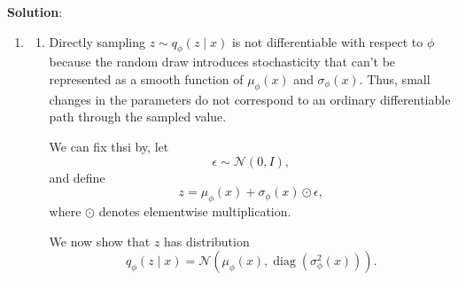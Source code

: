 \documentclass[submit]{harvardml}
\newenvironment{solution}{
    \vspace{2mm}
    \color{blue}\noindent\textbf{Solution}:
}{}
\begin{document}
\begin{solution}
\begin{enumerate}
\begin{enumerate}
\begin{enumerate}
Hence, \[
\boxed{
\mathrm{ELBO}
=
\mathbb{E}_{q_\phi(z\mid x)}[\log p(x\mid z)]
-
D_{\mathrm{KL}}\!\left(q_\phi(z\mid x)\,\|\,p(z)\right)
}.
\]
            \end{enumerate}
            \item \begin{enumerate}
                \item It measures how well the decoder can reconstruct the input \(x\) from a latent sample \(z \sim q_\phi(z\mid x)\). Minimizing it makes the encoder and decoder to preserve the information in \(x\) that is necessary for accurate reconstruction, just like a standard autoencoder tries to make its output match the input.
                \item The KL term prevents the encoder from assigning each input \(x\) to an arbitrary, isolated point in latent space, because it pushes every posterior \(q_\phi(z\mid x)\) to stay close to the shared prior \(p(z)=\mathcal{N}(0,I)\). Hence, the latent codes for different datapoints are forced to take a common, smooth structured region where sampling from the prior makes it appear in areas the decoder has been trained on, which makes generation of new data possible.
                \item  IN the VAE these two terms push the model into the directions described in i) and ii) above. Compared to a standard autoencoder, this yields either less exact reconstructions, but produces a smoother latent space and therefore more coherent samples when generating new data.
            \end{enumerate}
        \end{enumerate}
    \item \begin{enumerate}
        \item Directly sampling \(z \sim q_\phi(z\mid x)\) is not differentiable with respect to \(\phi\) because the random draw introduces stochasticity that can't be represented as a smooth function of \(\mu_\phi(x)\) and \(\sigma_\phi(x)\). Thus, small changes in the parameters do not correspond to an ordinary differentiable path through the sampled value.

We can fix thsi by, let
\[
\epsilon \sim \mathcal{N}(0,I),
\]
and define
\[
z = \mu_\phi(x) + \sigma_\phi(x)\odot \epsilon,
\]
where \(\odot\) denotes elementwise multiplication.

We now show that \(z\) has distribution
\[
q_\phi(z\mid x)=\mathcal{N}\!\left(\mu_\phi(x), \operatorname{diag}(\sigma_\phi^2(x))\right).
\]


\end{enumerate}
\end{enumerate}
\end{solution}
\end{document}
